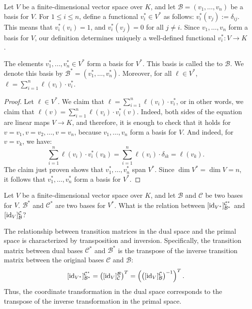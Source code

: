 Let $V$ be a finite-dimensional vector space over $K$, and let $\mathcal{B} = (v_1, \dots, v_n)$ be a basis for $V$. For $1 \leq i \leq n$, define a functional $v_i^* \in V^*$ as follows: $v_i^*(v_j) := \delta_{ij}$. This means that $v_i^*(v_i) = 1$, and $v_i^*(v_j) = 0$ for all $j \neq i$. Since $v_1, \dots, v_n$ form a basis for $V$, our definition determines uniquely a well-defined functional $v_i^* \colon V \to K$.

\begin{lemma}
  The elements $v_1^*, \dots, v_n^* \in V^*$ form a basis for $V^*$. This basis is called the  to $\mathcal{B}$. We denote this basis by $\mathcal{B}^* = (v_1^*, \dots, v_n^*)$. Moreover, for all $\ell \in V^*$, $\ell = \sum_{i=1}^n \ell(v_i) \cdot v_i^*$.
\end{lemma}

\begin{proof}
  Let $\ell \in V^*$. We claim that $\ell = \sum_{i=1}^n \ell(v_i) \cdot v_i^*$, or in other words, we claim that $\ell(v) = \sum_{i=1}^n \ell(v_i) \cdot v_i^*(v)$. Indeed, both sides of the equation are linear maps $V \to K$, and therefore, it is enough to check that it holds for $v = v_1, v = v_2, \dots, v = v_n$, because $v_1, \dots, v_n$ form a basis for $V$. And indeed, for $v = v_k$, we have:
  \[ \sum_{i=1}^n \ell(v_i) \cdot v_i^*(v_k) = \sum_{i=1}^n \ell(v_i) \cdot \delta_{ik} = \ell(v_k). \]
  The claim just proven shows that $v_1^*, \dots, v_n^*$ span $V^*$. Since $\dim V^* = \dim V = n$, it follows that $v_1^*, \dots, v_n^*$ form a basis for $V^*$.
\end{proof}

\begin{question}Let $V$ be a finite-dimensional vector space over $K$, and let $\mathcal{B}$ and $\mathcal{C}$ be two bases for $V$. $\mathcal{B}^*$ and $\mathcal{C}^*$ are two bases for $V^*$. What is the relation between $[\operatorname{id}_{V^*}]_{\mathcal{B}^*}^{\mathcal{C}^*}$ and $[\operatorname{id}_V]_{\mathcal{B}}^{\mathcal{C}}$?
\end{question}

\begin{proposition}
  The relationship between transition matrices in the dual space and the primal space is characterized by transposition and inversion. Specifically, the transition matrix between dual bases $\mathcal{C}^*$ and $\mathcal{B}^*$ is the transpose of the inverse transition matrix between the original bases $\mathcal{C}$ and $\mathcal{B}$:
  \[
  [\operatorname{id}_{V^*}]_{\mathcal{B}^*}^{\mathcal{C}^*} = \left( [\operatorname{id}_V]_{\mathcal{C}}^{\mathcal{B}} \right)^T = \left( \left( [\operatorname{id}_V]_{\mathcal{B}}^{\mathcal{C}} \right)^{-1} \right)^T.
  \]
  Thus, the coordinate transformation in the dual space corresponds to the transpose of the inverse transformation in the primal space.
\end{proposition}

